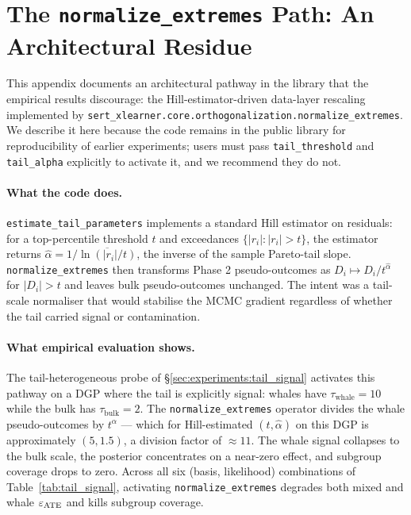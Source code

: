 \section{The \texttt{normalize\_extremes} Path: An Architectural Residue}
\label{app:evt_path}

This appendix documents an architectural pathway in the library
that the empirical results discourage: the Hill-estimator-driven
data-layer rescaling implemented by
\texttt{sert\_xlearner.core.orthogonalization.normalize\_extremes}.
We describe it here because the code remains in the public library
for reproducibility of earlier experiments; users must pass
\texttt{tail\_threshold} and \texttt{tail\_alpha} explicitly to
activate it, and we recommend they do not.

\paragraph{What the code does.}
\texttt{estimate\_tail\_parameters} implements a standard Hill
estimator on residuals: for a top-percentile threshold $t$ and
exceedances $\{|r_i| : |r_i| > t\}$, the estimator returns
$\hat\alpha = 1 / \overline{\ln(|r_i| / t)}$, the inverse of the
sample Pareto-tail slope. \texttt{normalize\_extremes} then
transforms Phase 2 pseudo-outcomes as
$D_i \mapsto D_i / t^{\hat\alpha}$ for $|D_i| > t$ and leaves bulk
pseudo-outcomes unchanged. The intent was a tail-scale normaliser
that would stabilise the MCMC gradient regardless of whether the
tail carried signal or contamination.

\paragraph{What empirical evaluation shows.}
The tail-heterogeneous probe of
\S\ref{sec:experiments:tail_signal} activates this pathway on
a DGP where the tail is explicitly signal: whales have
$\tau_{\text{whale}} = 10$ while the bulk has $\tau_{\text{bulk}} = 2$.
The \texttt{normalize\_extremes} operator divides the whale
pseudo-outcomes by $t^\alpha$ --- which for Hill-estimated
$(t, \hat\alpha)$ on this DGP is approximately $(5, 1.5)$, a
division factor of $\approx 11$. The whale signal collapses to the
bulk scale, the posterior concentrates on a near-zero effect, and
subgroup coverage drops to zero. Across all six (basis,
likelihood) combinations of Table~\ref{tab:tail_signal}, activating
\texttt{normalize\_extremes} degrades both mixed and whale
$\varepsilon_{\mathrm{ATE}}$ and kills subgroup coverage.

